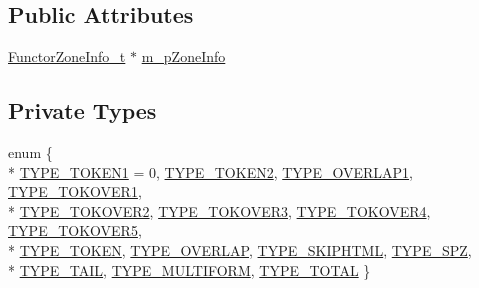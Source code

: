 \subsection*{Public Attributes}
\begin{DoxyCompactItemize}
\item 
\hyperlink{structFunctorZoneInfo__t}{Functor\-Zone\-Info\-\_\-t} $\ast$ \hyperlink{classCacheStreamer__c_a56b939f9af3ad9c06109a3706a3647c9}{m\-\_\-p\-Zone\-Info}
\end{DoxyCompactItemize}
\subsection*{Private Types}
\begin{DoxyCompactItemize}
\item 
enum \{ \\*
\hyperlink{classCacheStreamer__c_a9448525bd59b03890ae82c26a8f46fcfa5e3fff92c533433912ac3bc3782b8220}{T\-Y\-P\-E\-\_\-\-T\-O\-K\-E\-N1} = 0, 
\hyperlink{classCacheStreamer__c_a9448525bd59b03890ae82c26a8f46fcfa7878cebbdac9524ca0eede05d8c27645}{T\-Y\-P\-E\-\_\-\-T\-O\-K\-E\-N2}, 
\hyperlink{classCacheStreamer__c_a9448525bd59b03890ae82c26a8f46fcfa8720cbb0a269db104bb5700adb122b24}{T\-Y\-P\-E\-\_\-\-O\-V\-E\-R\-L\-A\-P1}, 
\hyperlink{classCacheStreamer__c_a9448525bd59b03890ae82c26a8f46fcfae561c9192f4e5bd0dbbc8d05da4f88ea}{T\-Y\-P\-E\-\_\-\-T\-O\-K\-O\-V\-E\-R1}, 
\\*
\hyperlink{classCacheStreamer__c_a9448525bd59b03890ae82c26a8f46fcfa03213d8b5b7ff22da4040ee7bfabe45a}{T\-Y\-P\-E\-\_\-\-T\-O\-K\-O\-V\-E\-R2}, 
\hyperlink{classCacheStreamer__c_a9448525bd59b03890ae82c26a8f46fcfaec8a56fae3e9b7de82f6f48119f46170}{T\-Y\-P\-E\-\_\-\-T\-O\-K\-O\-V\-E\-R3}, 
\hyperlink{classCacheStreamer__c_a9448525bd59b03890ae82c26a8f46fcfa8d7bedb022431d2ae34a63f525be9967}{T\-Y\-P\-E\-\_\-\-T\-O\-K\-O\-V\-E\-R4}, 
\hyperlink{classCacheStreamer__c_a9448525bd59b03890ae82c26a8f46fcfa951700de877e2bc4f212294750f0004c}{T\-Y\-P\-E\-\_\-\-T\-O\-K\-O\-V\-E\-R5}, 
\\*
\hyperlink{classCacheStreamer__c_a9448525bd59b03890ae82c26a8f46fcfa7d8dd12970f5babc38a361074617b9c7}{T\-Y\-P\-E\-\_\-\-T\-O\-K\-E\-N}, 
\hyperlink{classCacheStreamer__c_a9448525bd59b03890ae82c26a8f46fcfa4735f73ca8710ce795f673d6904e2bfb}{T\-Y\-P\-E\-\_\-\-O\-V\-E\-R\-L\-A\-P}, 
\hyperlink{classCacheStreamer__c_a9448525bd59b03890ae82c26a8f46fcfa86fccc168fe64c94549bec8b23a29f77}{T\-Y\-P\-E\-\_\-\-S\-K\-I\-P\-H\-T\-M\-L}, 
\hyperlink{classCacheStreamer__c_a9448525bd59b03890ae82c26a8f46fcfacf0e4f0584e17cb0399942d7c316a19a}{T\-Y\-P\-E\-\_\-\-S\-P\-Z}, 
\\*
\hyperlink{classCacheStreamer__c_a9448525bd59b03890ae82c26a8f46fcfa3fb82633aec6323854c87fe1834256c4}{T\-Y\-P\-E\-\_\-\-T\-A\-I\-L}, 
\hyperlink{classCacheStreamer__c_a9448525bd59b03890ae82c26a8f46fcfa30bd9d1c0c049b733ce9cb449438e928}{T\-Y\-P\-E\-\_\-\-M\-U\-L\-T\-I\-F\-O\-R\-M}, 
\hyperlink{classCacheStreamer__c_a9448525bd59b03890ae82c26a8f46fcfa9f1968a919d3d1f1f7714e28edb72143}{T\-Y\-P\-E\-\_\-\-T\-O\-T\-A\-L}
 \}
\end{DoxyCompactItemize}
